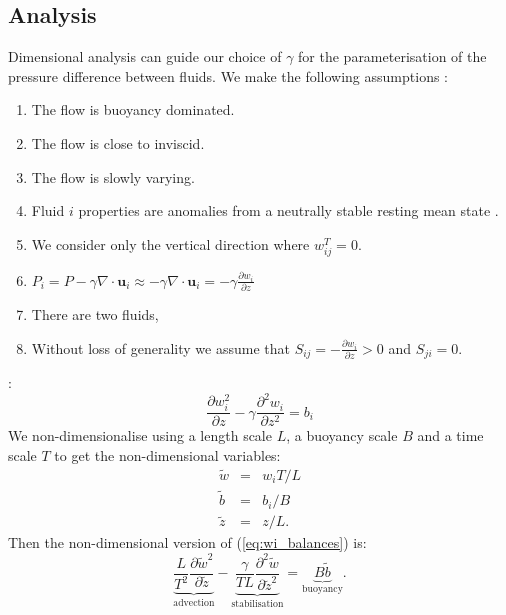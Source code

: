 \documentclass[draft]{agujournal2019}
\begin{document}
\subsection{\label{subsec:dimAnal}
 Analysis}

Dimensional analysis can guide our choice of $\gamma$ for the parameterisation of the pressure difference between fluids. We make the following assumptions
:
\begin{enumerate}
\item The flow is buoyancy dominated.
\item The flow is close to inviscid.
\item The flow is slowly varying.
\item Fluid $i$ properties are anomalies from a neutrally stable resting
mean state 
.
\item We consider only the vertical direction where $w_{ij}^{T}=0$.
\item $P_{i}=P-\gamma\nabla\cdot\mathbf{u}_{i}\approx-\gamma\nabla\cdot\mathbf{u}_{i}=-\gamma\frac{\partial w_{i}}{\partial z}$
\item There are two fluids, 
\item Without loss of generality we assume that $S_{ij}=-\frac{\partial w_{i}}{\partial z}>0$
and $S_{ji}=0$.
\end{enumerate}
:
\begin{equation}
\frac{\partial w_{i}^{2}}{\partial z}-\gamma\frac{\partial^{2}w_{i}}{\partial z^{2}}=b_{i}\label{eq:wi_balances}
\end{equation}
We non-dimensionalise using a length scale $L$, a buoyancy scale
$B$ and a time scale $T$ to get the non-dimensional variables:
\begin{eqnarray*}
\tilde{w} & = & w_{i}T/L\\
\tilde{b} & = & b_{i}/B\\
\tilde{z} & = & z/L.
\end{eqnarray*}
Then the non-dimensional version of (\ref{eq:wi_balances}) is:
\begin{equation}
\underbrace{{\frac{L}{T^{2}}\frac{\partial\tilde{w}^{2}}{\partial\tilde{z}}}}_{\text{advection}}-\underbrace{{\frac{\gamma}{TL}\frac{\partial^{2}\tilde{w}}{\partial\tilde{z}^{2}}}}_{\text{stabilisation}}=\underbrace{B\tilde{b}}_{\text{buoyancy}}.\label{eq:wi_nonDomTmp}
\end{equation}
\end{document}

